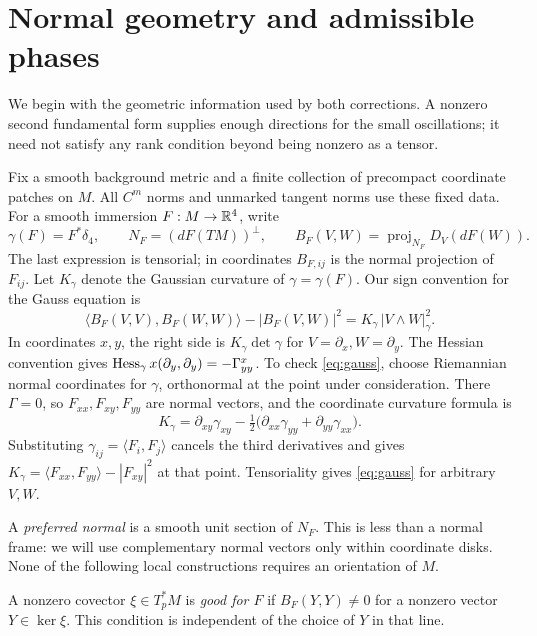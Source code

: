 \section{Normal geometry and admissible phases}\label{sec:preliminaries}

We begin with the geometric information used by both corrections. A nonzero
second fundamental form supplies enough directions for the small oscillations;
it need not satisfy any rank condition beyond being nonzero as a tensor.

Fix a smooth background metric and a finite collection of precompact coordinate
patches on $M$. All $C^m$ norms and unmarked tangent norms use these fixed data.
For a smooth immersion $F:M\to\mathbb{R}^4$, write
\[
 \gamma(F)=F^*\delta_4,
 \qquad N_F=(dF(TM))^\perp,
 \qquad B_F(V,W)=\operatorname{proj}_{N_F}D_V(dF(W)).
\]
The last expression is tensorial; in coordinates $B_{F,ij}$ is the normal
projection of $F_{ij}$. Let $K_\gamma$ denote the Gaussian curvature of
$\gamma=\gamma(F)$. Our sign convention for the Gauss equation is
\begin{equation}\label{eq:gauss}
 \langle B_F(V,V),B_F(W,W)\rangle-|B_F(V,W)|^2
 =K_\gamma\,|V\wedge W|_\gamma^2.
\end{equation}
In coordinates $x,y$, the right side is $K_\gamma\det\gamma$ for
$V=\partial_x,W=\partial_y$. The Hessian convention gives
$\operatorname{Hess}_\gamma x(\partial_y,\partial_y)=-\Gamma^x_{yy}$.
To check \eqref{eq:gauss}, choose Riemannian normal coordinates for
$\gamma$, orthonormal at the point under consideration.
There $\Gamma=0$, so $F_{xx},F_{xy},F_{yy}$ are normal vectors, and the
coordinate curvature formula is
\[
 K_\gamma=\partial_{xy}\gamma_{xy}
 -\tfrac12\bigl(\partial_{xx}\gamma_{yy}
                  +\partial_{yy}\gamma_{xx}\bigr).
\]
Substituting $\gamma_{ij}=\langle F_i,F_j\rangle$ cancels the third
derivatives and gives
$K_\gamma=\langle F_{xx},F_{yy}\rangle-|F_{xy}|^2$ at that point.
Tensoriality gives \eqref{eq:gauss} for arbitrary $V,W$.

A \emph{preferred normal} is a smooth unit section of $N_F$. This is less than a
normal frame: we will use complementary normal vectors only within coordinate
disks. None of the following local constructions requires an orientation of $M$.

\begin{definition}
A nonzero covector $\xi\in T_p^*M$ is \emph{good for $F$} if
$B_F(Y,Y)\ne0$ for a nonzero vector $Y\in\ker\xi$.
This condition is independent of the choice of $Y$ in that line.
\end{definition}

